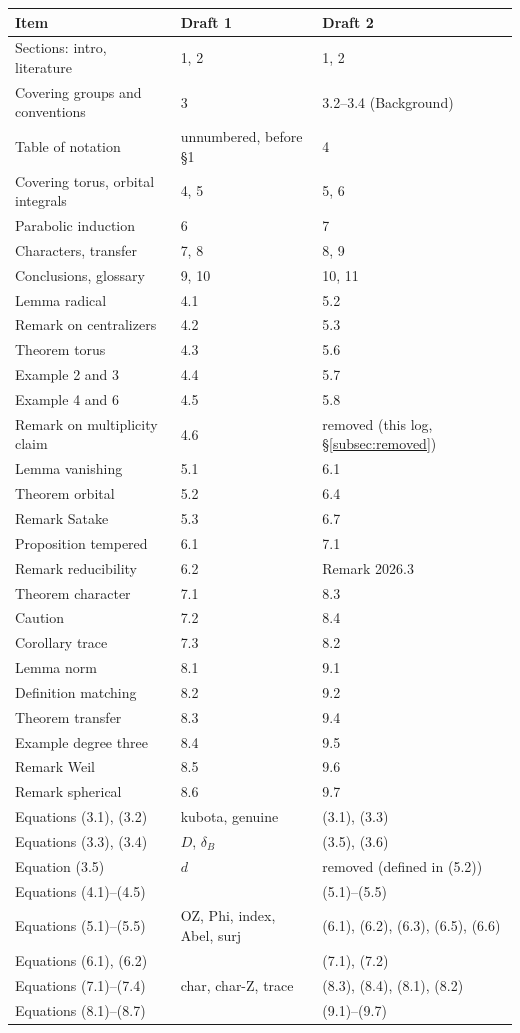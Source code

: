 \documentclass[12pt,letterpaper]{article}
\begin{document}
\begin{longtable}{@{}lll@{}}
\toprule
Item & Draft 1 & Draft 2\\
\midrule
\endhead
Sections: intro, literature & 1, 2 & 1, 2\\
Covering groups and conventions & 3 & 3.2--3.4 (Background)\\
Table of notation & unnumbered, before \S1 & 4\\
Covering torus, orbital integrals & 4, 5 & 5, 6\\
Parabolic induction & 6 & 7\\
Characters, transfer & 7, 8 & 8, 9\\
Conclusions, glossary & 9, 10 & 10, 11\\
Lemma radical & 4.1 & 5.2\\
Remark on centralizers & 4.2 & 5.3\\
Theorem torus & 4.3 & 5.6\\
Example 2 and 3 & 4.4 & 5.7\\
Example 4 and 6 & 4.5 & 5.8\\
Remark on multiplicity claim & 4.6 & removed (this log, \S\ref{subsec:removed})\\
Lemma vanishing & 5.1 & 6.1\\
Theorem orbital & 5.2 & 6.4\\
Remark Satake & 5.3 & 6.7\\
Proposition tempered & 6.1 & 7.1\\
Remark reducibility & 6.2 & Remark 2026.3\\
Theorem character & 7.1 & 8.3\\
Caution & 7.2 & 8.4\\
Corollary trace & 7.3 & 8.2\\
Lemma norm & 8.1 & 9.1\\
Definition matching & 8.2 & 9.2\\
Theorem transfer & 8.3 & 9.4\\
Example degree three & 8.4 & 9.5\\
Remark Weil & 8.5 & 9.6\\
Remark spherical & 8.6 & 9.7\\
Equations (3.1), (3.2) & kubota, genuine & (3.1), (3.3)\\
Equations (3.3), (3.4) & $D$, $\delta_B$ & (3.5), (3.6)\\
Equation (3.5) & $d$ & removed (defined in (5.2))\\
Equations (4.1)--(4.5) & & (5.1)--(5.5)\\
Equations (5.1)--(5.5) & OZ, Phi, index, Abel, surj & (6.1), (6.2),
(6.3), (6.5), (6.6)\\
Equations (6.1), (6.2) & & (7.1), (7.2)\\
Equations (7.1)--(7.4) & char, char-Z, trace & (8.3), (8.4), (8.1),
(8.2)\\
Equations (8.1)--(8.7) & & (9.1)--(9.7)\\
\bottomrule
\end{longtable}
\end{document}
